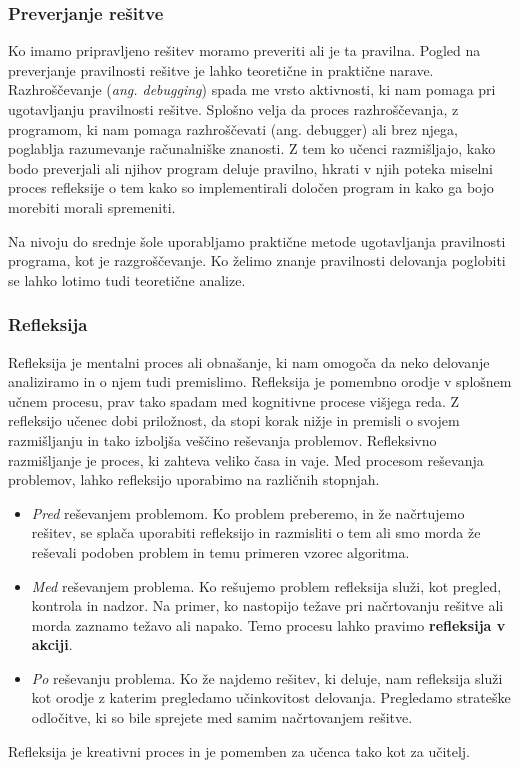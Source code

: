 \subsubsection{Preverjanje rešitve}
\label{sec:preverjanje_rešitve}
Ko imamo pripravljeno rešitev moramo preveriti ali je ta
pravilna. Pogled na preverjanje pravilnosti rešitve je lahko
teoretične in praktične narave. Razhroščevanje (\emph{ang. debugging})
spada me vrsto aktivnosti, ki nam pomaga pri ugotavljanju pravilnosti
rešitve. Splošno velja da proces razhroščevanja, z programom, ki nam
pomaga razhroščevati (ang. debugger) ali brez njega, poglablja
razumevanje računalniške znanosti. Z tem ko učenci razmišljajo, kako
bodo preverjali ali njihov program deluje pravilno, hkrati v njih
poteka miselni proces refleksije o tem kako so implementirali določen
program in kako ga bojo morebiti morali spremeniti.

Na nivoju do srednje šole uporabljamo praktične metode ugotavljanja
pravilnosti programa, kot je razgroščevanje. Ko želimo znanje
pravilnosti delovanja poglobiti se lahko lotimo tudi teoretične
analize.

\subsubsection{Refleksija}
\label{sec:refleksije}

Refleksija je mentalni proces ali obnašanje, ki nam omogoča da neko
delovanje analiziramo in o njem tudi premislimo. Refleksija je
pomembno orodje v splošnem učnem procesu, prav tako spadam med
kognitivne procese višjega reda. Z refleksijo učenec dobi priložnost,
da stopi korak nižje in premisli o svojem razmišljanju in tako
izboljša veščino reševanja problemov. Refleksivno razmišljanje je
proces, ki zahteva veliko časa in vaje. Med procesom reševanja
problemov, lahko refleksijo uporabimo na različnih stopnjah.

\begin{itemize}
\tightlist
\item \emph{Pred} reševanjem problemom. Ko problem preberemo, in že
  načrtujemo rešitev, se splača uporabiti refleksijo in razmisliti o
  tem ali smo morda že reševali podoben problem in temu primeren
  vzorec algoritma.
\item \emph{Med} reševanjem problema. Ko rešujemo problem refleksija
  služi, kot pregled, kontrola in nadzor. Na primer, ko nastopijo
  težave pri načrtovanju rešitve ali morda zaznamo težavo ali
  napako. Temo procesu lahko pravimo \textbf{refleksija v akciji}.
\item \emph{Po} reševanju problema. Ko že najdemo rešitev, ki deluje,
  nam refleksija služi kot orodje z katerim pregledamo učinkovitost
  delovanja. Pregledamo strateške odločitve, ki so bile sprejete med
  samim načrtovanjem rešitve.
\end{itemize}

Refleksija je kreativni proces in je pomemben za učenca tako kot za
učitelj.


